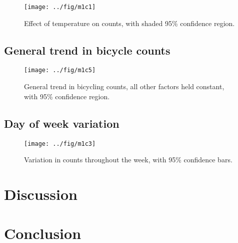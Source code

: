 \documentclass[12pt,letterpaper,article]{memoir} %
\begin{document}
\begin{figure}[h!]
  \centering
  \texttt{[image: ../fig/m1c1]}
  \caption{Effect of temperature on counts, with shaded 95\%
    confidence region.}
  \label{fg:temperature}
\end{figure}



\subsection*{General trend in bicycle counts}

\begin{figure}[h!]
  \centering
  \texttt{[image: ../fig/m1c5]}
  \caption{General trend in bicycling counts, all other factors held
    constant, with 95\% confidence region.}
  \label{fg:trend}
\end{figure}



\subsection*{Day of week variation}

\begin{figure}[h!]
  \centering
  \texttt{[image: ../fig/m1c3]}
  \caption{Variation in counts throughout the week, with 95\% confidence bars.}
  \label{fg:dayofweek}
\end{figure}

\clearpage
\section*{Discussion}


\section*{Conclusion}


\printbibliography
\end{document}
